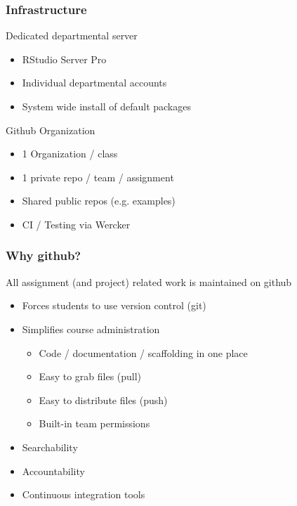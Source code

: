\documentclass[12pt]{beamer}
\begin{document}

\begin{frame}
\frametitle{Infrastructure}

Dedicated departmental server
\begin{itemize}
\item RStudio Server Pro
\item Individual departmental accounts
\item System wide install of default packages
\end{itemize}

\vspace{3mm}

Github Organization
\begin{itemize}
\item 1 Organization / class
\item 1 private repo / team / assignment
\item Shared public repos (e.g. examples)
\item CI / Testing via Wercker
\end{itemize}

\end{frame}



\begin{frame}
\frametitle{Why github?}

All assignment (and project) related work is maintained on github 

\vspace{1.5mm}

\begin{itemize}
\item Forces students to use version control (git)
\item Simplifies course administration
\begin{itemize}
\item Code / documentation / scaffolding in one place
\item Easy to grab files (pull)
\item Easy to distribute files (push)
\item Built-in team permissions
\end{itemize}
\item Searchability
\item Accountability
\item Continuous integration tools
\end{itemize}

\end{frame}
\end{document}
